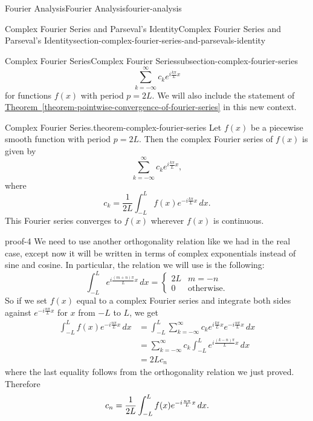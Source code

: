 \documentclass[oneside,10pt,]{book}
\renewcommand{\qedhere}{\relax}
\numberwithin{equation}{section}
\newcommand{\amp}{&}
\begin{document}
\begin{chapterptx}{Fourier Analysis}{}{Fourier Analysis}{}{}{fourier-analysis}
\begin{sectionptx}{Complex Fourier Series and Parseval's Identity}{}{Complex Fourier Series and Parseval's Identity}{}{}{section-complex-fourier-series-and-parsevals-identity}
\begin{subsectionptx}{Complex Fourier Series}{}{Complex Fourier Series}{}{}{subsection-complex-fourier-series}
\begin{equation*}
\sum_{k=-\infty}^{\infty}c_{k}e^{i\frac{k\pi}{L}x}
\end{equation*}
for functions \(f(x)\) with period \(p=2L\). We will also include the statement of \hyperref[theorem-pointwise-convergence-of-fourier-series]{Theorem~\ref{theorem-pointwise-convergence-of-fourier-series}} in this new context.%
\begin{theorem}{Complex Fourier Series.}{}{theorem-complex-fourier-series}%
\hypertarget{p-603}{}%
Let \(f(x)\) be a piecewise smooth function with period \(p=2L\). Then the complex Fourier series of \(f(x)\) is given by%
\begin{equation*}
\sum_{k=-\infty}^{\infty}c_{k}e^{i\frac{k\pi}{L}x},
\end{equation*}
where%
\begin{equation*}
c_{k} = \frac{1}{2L}\int_{-L}^{L}f(x)e^{-i\frac{k\pi}{L}x}\,dx.
\end{equation*}
This Fourier series converges to \(f(x)\) wherever \(f(x)\) is continuous.%
\end{theorem}
\begin{proofptx}{}{proof-4}
\hypertarget{p-604}{}%
We need to use another orthogonality relation like we had in the real case, except now it will be written in terms of complex exponentials instead of sine and cosine. In particular, the relation we will use is the following:%
\begin{equation*}
\int_{-L}^{L}e^{i\frac{(m+n)\pi}{L}x}\,dx = \begin{cases} 2L \amp m=-n \\ 0 \amp \text{otherwise.}\end{cases}
\end{equation*}
So if we set \(f(x)\) equal to a complex Fourier series and integrate both sides against \(e^{-i\frac{n\pi}{L}x}\) for \(x\) from \(-L\) to \(L\), we get%
\begin{align*}
\int_{-L}^{L}f(x)e^{-i\frac{n\pi}{L}x}\,dx \amp = \int_{-L}^{L}\sum_{k=-\infty}^{\infty}c_{k}e^{i\frac{k\pi}{L}x}e^{-i\frac{n\pi}{L}x}\,dx \\
\amp= \sum_{k=-\infty}^{\infty}c_{k}\int_{-L}^{L}e^{i\frac{(k-n)\pi}{L}x}\,dx\\
\amp= 2Lc_{n}
\end{align*}
where the last equality follows from the orthogonality relation we just proved. Therefore%
\begin{equation*}
c_{n} = \frac{1}{2L}\int_{-L}^{L}f(x)e^{-i\frac{n\pi}{L}x}\,dx.\qedhere

\end{equation*}
\end{proofptx}
\end{subsectionptx}
\end{sectionptx}
\end{chapterptx}
\end{document}
